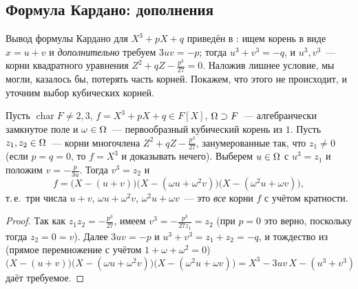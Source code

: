 \subsection*{Формула Кардано: дополнения}

Вывод формулы Кардано для $X^3+pX+q$ приведён в : ищем корень в виде $x=u+v$ и \emph{дополнительно} требуем
$3uv=-p$; тогда $u^3+v^3=-q$, и $u^3,v^3$~--- корни квадратного уравнения $Z^2+qZ-\frac{p^3}{27}=0$. Наложив лишнее условие,
мы могли, казалось бы, потерять часть корней. Покажем, что этого не происходит, и уточним выбор кубических корней.

\begin{theorem}
Пусть $\operatorname{char}F\ne2,3$, $f=X^3+pX+q\in F[X]$, $\Omega\supset F$~--- алгебраически замкнутое поле и $\omega\in\Omega$~---
первообразный кубический корень из $1$. Пусть $z_1,z_2\in\Omega$~--- корни многочлена $Z^2+qZ-\frac{p^3}{27}$, занумерованные так,
что $z_1\ne0$ (если $p=q=0$, то $f=X^3$ и доказывать нечего). Выберем $u\in\Omega$ с $u^3=z_1$ и положим $v=-\frac p{3u}$. Тогда
$v^3=z_2$ и
\[
f=\bigl(X-(u+v)\bigr)\bigl(X-(\omega u+\omega^2v)\bigr)\bigl(X-(\omega^2u+\omega v)\bigr),
\]
т.\,е.\ три числа $u+v$, $\omega u+\omega^2v$, $\omega^2u+\omega v$~--- это \emph{все} корни $f$ с учётом кратности.
\end{theorem}

\begin{proof}
Так как $z_1z_2=-\frac{p^3}{27}$, имеем $v^3=-\frac{p^3}{27z_1}=z_2$ (при $p=0$ это верно, поскольку тогда $z_2=0=v$). Далее
$3uv=-p$ и $u^3+v^3=z_1+z_2=-q$, и тождество из  (прямое перемножение с учётом $1+\omega+\omega^2=0$)
\[
\bigl(X-(u+v)\bigr)\bigl(X-(\omega u+\omega^2v)\bigr)\bigl(X-(\omega^2u+\omega v)\bigr)=X^3-3uv\,X-(u^3+v^3)
\]
даёт требуемое.
\end{proof}

